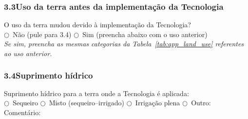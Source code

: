 \subsubsection*{3.3\quad Uso da terra antes da implementação da Tecnologia}

O uso da terra mudou devido à implementação da Tecnologia?\\
$\bigcirc$~Não (pule para 3.4) \qquad $\bigcirc$~Sim (preencha abaixo com o uso anterior)\\[4pt]
\textit{Se sim, preencha as mesmas categorias da Tabela~\ref{tab:app_land_use} referentes ao uso anterior.}

\subsubsection*{3.4\quad Suprimento hídrico}

Suprimento hídrico para a terra onde a Tecnologia é aplicada:\\
$\bigcirc$~Sequeiro \quad $\bigcirc$~Misto (sequeiro--irrigado) \quad $\bigcirc$~Irrigação plena \quad $\bigcirc$~Outro: \dotfill\\
Comentário: \dotfill

